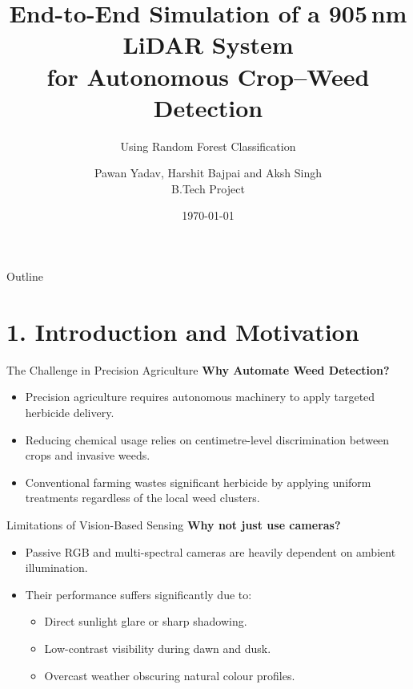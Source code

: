 \documentclass[10pt,aspectratio=169]{beamer}
\title[905\,nm LiDAR Weed Detection]{End-to-End Simulation of a 905\,nm LiDAR System \\ for Autonomous Crop--Weed Detection}
\subtitle{Using Random Forest Classification}
\author[Yadav, Bajpai, \& Singh]{Pawan Yadav, Harshit Bajpai and Aksh Singh \\ \small B.Tech Project}
\institute[IIT BHU]{Indian Institute of Technology (BHU) Varanasi}
\date{\today}
\begin{document}
\begin{frame}
    \titlepage
\end{frame}

\begin{frame}{Outline}
    \tableofcontents[hideallsubsections]
\end{frame}

\section{1. Introduction and Motivation}

\begin{frame}{The Challenge in Precision Agriculture}
    \textbf{Why Automate Weed Detection?}
    \begin{itemize}
        \item Precision agriculture requires autonomous machinery to apply targeted herbicide delivery.
        \item Reducing chemical usage relies on centimetre-level discrimination between crops and invasive weeds.
        \item Conventional farming wastes significant herbicide by applying uniform treatments regardless of the local weed clusters.
    \end{itemize}
\end{frame}

\begin{frame}{Limitations of Vision-Based Sensing}
    \textbf{Why not just use cameras?}
    \begin{itemize}
        \item Passive RGB and multi-spectral cameras are heavily dependent on ambient illumination.
        \item Their performance suffers significantly due to:
        \begin{itemize}
            \item Direct sunlight glare or sharp shadowing.
            \item Low-contrast visibility during dawn and dusk.
            \item Overcast weather obscuring natural colour profiles.
        \end{itemize}
    \end{itemize}
\end{frame}
\end{document}
